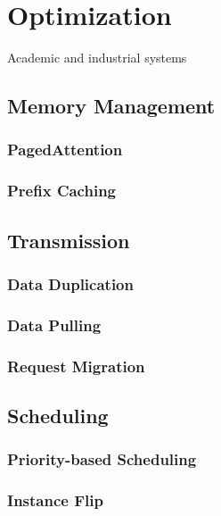\section{Optimization}
\label{sec:inference_engine}
\label{sec:model-level-opt}
\label{sec:system-level-opt}
Academic and industrial systems

\subsection{Memory Management}

\subsubsection{PagedAttention}

\subsubsection{Prefix Caching}

\subsection{Transmission}

\subsubsection{Data Duplication}

\subsubsection{Data Pulling}

\subsubsection{Request Migration}

\subsection{Scheduling}

\subsubsection{Priority-based Scheduling}

\subsubsection{Instance Flip}

